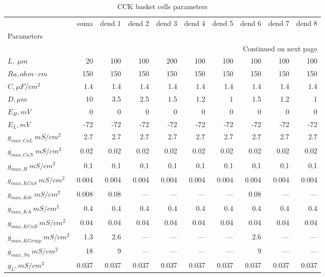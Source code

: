 \begin{longtable}{lrrrrrrrrr}
\caption{CCK basket cells parameters}\label{ca1_bas_cell_parameters}\\
\toprule
{} &  soma & dend 1 & dend 2 & dend 3 & dend 4 & dend 5 & dend 6 & dend 7 & dend 8 \\
Parameters      &       &        &        &        &        &        &        &        &        \\
\midrule
\endhead
\midrule
\multicolumn{10}{r}{{Continued on next page}} \\
\midrule
\endfoot

\bottomrule
\endlastfoot
$L, \ \mu m$ &    20 &    100 &    100 &    200 &    100 &    100 &    100 &    100 &    100 \\
$Ra,
 ohm \cdot cm$              &   150 &    150 &    150 &    150 &    150 &    150 &    150 &    150 &    150 \\
$C, \mu F / cm^2$              &   1.4 &    1.4 &    1.4 &    1.4 &    1.4 &    1.4 &    1.4 &    1.4 &    1.4 \\
$D, \mu m$            &    10 &    3.5 &    2.5 &    1.5 &    1.2 &      1 &    1.5 &    1.2 &      1 \\
$E_{H}, mV$        &     0 &      0 &      0 &      0 &      0 &      0 &      0 &      0 &      0 \\
$E_L,  mV$       &   -72 &    -72 &    -72 &    -72 &    -72 &    -72 &    -72 &    -72 &    -72 \\
$g_{max, CaL    }\  mS / cm^2$&   2.7 &    2.7 &    2.7 &    2.7 &    2.7 &    2.7 &    2.7 &    2.7 &    2.7 \\
$g_{max, CaN    }\  mS / cm^2$&  0.02 &   0.02 &   0.02 &   0.02 &   0.02 &   0.02 &   0.02 &   0.02 &   0.02 \\
$g_{max, H     }\  mS / cm^2$&   0.1 &    0.1 &    0.1 &    0.1 &    0.1 &    0.1 &    0.1 &    0.1 &    0.1 \\
$g_{max, KCaS    }\  mS / cm^2$& 0.004 &  0.004 &  0.004 &  0.004 &  0.004 &  0.004 &  0.004 &  0.004 &  0.004 \\
$g_{max, Kdr }\  mS / cm^2$& 0.008 &   0.08 &   ---  &   ---  &   ---  &   ---  &   0.08 &   ---  &   ---  \\
$g_{max, KA     }\  mS / cm^2$&   0.4 &    0.4 &    0.4 &    0.4 &    0.4 &    0.4 &    0.4 &    0.4 &    0.4 \\
$g_{max, KCaB   }\  mS / cm^2$&  0.04 &   0.04 &   0.04 &   0.04 &   0.04 &   0.04 &   0.04 &   0.04 &   0.04 \\
$g_{max, KGroup }\  mS / cm^2$&   1.3 &    2.6 &   ---  &   ---  &   ---  &   ---  &    2.6 &   ---  &   ---  \\
$g_{max, Na  }\  mS / cm^2$&    18 &      9 &   ---  &   ---  &   ---  &   ---  &      9 &   ---  &   ---  \\
$g_L,  mS / cm^2$    & 0.037 &  0.037 &  0.037 &  0.037 &  0.037 &  0.037 &  0.037 &  0.037 &  0.037 \\
\end{longtable}
